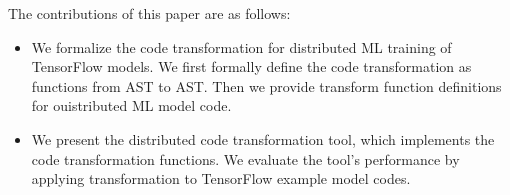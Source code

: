 The contributions of this paper are as follows:

\begin{itemize}
  \item We formalize the code transformation for distributed ML training
        of TensorFlow models. We first formally define the code transformation
        as functions from AST to AST. Then we provide transform function
        definitions for ouistributed ML model code.
  \item We present the distributed code transformation tool, which implements
        the code transformation functions. We evaluate the tool's performance
        by applying transformation to TensorFlow example model codes.
\end{itemize}
